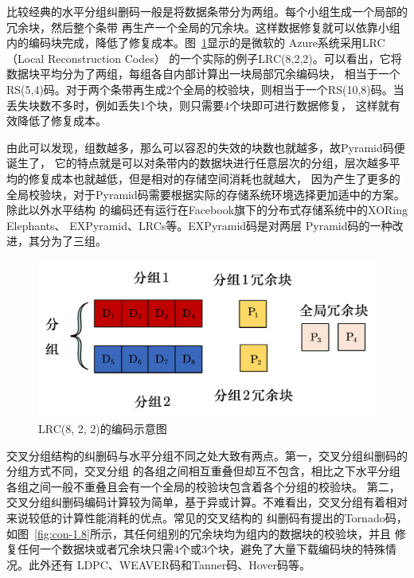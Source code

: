 比较经典的水平分组纠删码一般是将数据条带分为两组。每个小组生成一个局部的冗余块，然后整个条带
再生产一个全局的冗余块。这样数据修复就可以依靠小组内的编码块完成，降低了修复成本。图~\ref{fig:con-1.7}显示的是微软的
Azure系统\cite{calder2011windows}采用LRC（Local Reconstruction Codes）\cite{huang2012erasure}
的一个实际的例子LRC(8,2,2)。可以看出，它将数据块平均分为了两组，每组各自内部计算出一块局部冗余编码块，
相当于一个RS(5,4)码。对于两个条带再生成2个全局的校验块，则相当于一个RS(10,8)码。当丢失块数不多时，例如丢失1个块，则只需要4个块即可进行数据修复，
这样就有效降低了修复成本。



由此可以发现，组数越多，那么可以容忍的失效的块数也就越多，故Pyramid码\cite{huang2013pyramid}便诞生了，
它的特点就是可以对条带内的数据块进行任意层次的分组，层次越多平均的修复成本也就越低，但是相对的存储空间消耗也就越大，
因为产生了更多的全局校验块，对于Pyramid码需要根据实际的存储系统环境选择更加适中的方案。除此以外水平结构
的编码还有运行在Facebook旗下的分布式存储系统中的XORing Elephants\cite{sathiamoorthy2013xoring}、
EXPyramid\cite{周松2011expyramid}、LRCs\cite{sathiamoorthy2013xoring}等。EXPyramid码是对两层
Pyramid码的一种改进，其分为了三组。


\begin{figure}[htbp]
	\centering
	\includegraphics [scale=0.5]{figures/1.7.pdf}
	\caption{LRC(8, 2, 2)的编码示意图}
	\label{fig:con-1.7}
\end{figure}


交叉分组结构的纠删码与水平分组不同之处大致有两点。第一，交叉分组纠删码的分组方式不同，交叉分组
的各组之间相互重叠但却互不包含，相比之下水平分组各组之间一般不重叠且会有一个全局的校验块包含着各个分组的校验块。
第二，交叉分组纠删码编码计算较为简单，基于异或计算。不难看出，交叉分组有着相对来说较低的计算性能消耗的优点。常见的交叉结构的
纠删码有\citet{woitaszek2007tornado}提出的Tornado码，如图~\ref{fig:con-1.8}所示，其任何组别的冗余块均为组内的数据块的校验块，并且
修复任何一个数据块或者冗余块只需4个或3个块，避免了大量下载编码块的特殊情况。此外还有
LDPC\cite{gallager1962low}、WEAVER码\cite{hafner2005weaver}和Tanner码、Hover码\cite{hafner2006hover}等。

